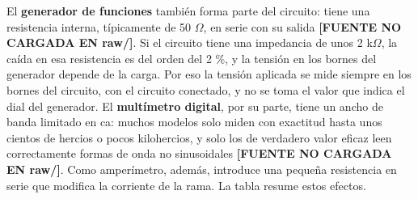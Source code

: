 \documentclass[11pt,letterpaper]{article}
\begin{document}
El \textbf{generador de funciones} también forma parte del circuito: tiene una resistencia interna, típicamente de 50 \ensuremath{\Omega}, en serie con su salida \textcolor{iuborange}{\textbf{[FUENTE NO CARGADA EN raw/]}}. Si el circuito tiene una impedancia de unos 2 k\ensuremath{\Omega}, la caída en esa resistencia es del orden del 2 \%, y la tensión en los bornes del generador depende de la carga. Por eso la tensión aplicada se mide siempre en los bornes del circuito, con el circuito conectado, y no se toma el valor que indica el dial del generador. El \textbf{multímetro digital}, por su parte, tiene un ancho de banda limitado en ca: muchos modelos solo miden con exactitud hasta unos cientos de hercios o pocos kilohercios, y solo los de verdadero valor eficaz leen correctamente formas de onda no sinusoidales \textcolor{iuborange}{\textbf{[FUENTE NO CARGADA EN raw/]}}. Como amperímetro, además, introduce una pequeña resistencia en serie que modifica la corriente de la rama. La tabla resume estos efectos.
\end{document}
